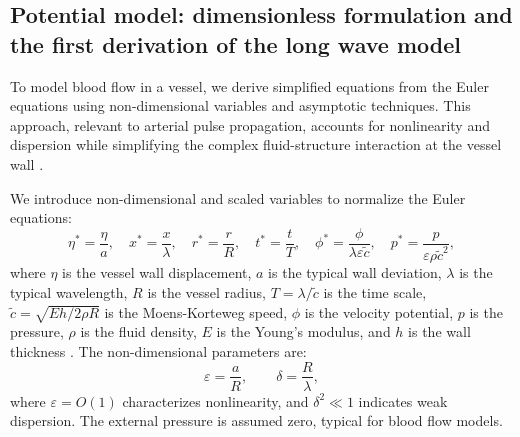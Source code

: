 \documentclass[alpha-refs, 12pt]{wiley-article}
\newcommand{\eps}{\varepsilon}
\begin{document}
\subsection{Potential model: dimensionless formulation and the first derivation of the long wave model}\label{sec:dimless_longwave}

To model blood flow in a vessel, we derive simplified equations from the Euler equations using non-dimensional variables and asymptotic techniques. This approach, relevant to arterial pulse propagation, accounts for nonlinearity and dispersion while simplifying the complex fluid-structure interaction at the vessel wall \cite{Fung1993}.

We introduce non-dimensional and scaled variables to normalize the Euler equations:
\begin{equation}\label{eq:ndv}
  \eta^* = \frac{\eta}{a}, \quad x^* = \frac{x}{\lambda}, \quad r^* = \frac{r}{R}, \quad t^* = \frac{t}{T}, \quad \phi^* = \frac{\phi}{\lambda \eps \tilde{c}}, \quad p^* = \frac{p}{\eps \rho \tilde{c}^2},
\end{equation}
where $\eta$ is the vessel wall displacement, $a$ is the typical wall deviation, $\lambda$ is the typical wavelength, $R$ is the vessel radius, $T = \lambda / \tilde{c}$ is the time scale, $\tilde{c} = \sqrt{E h / 2 \rho R}$ is the Moens-Korteweg speed, $\phi$ is the velocity potential, $p$ is the pressure, $\rho$ is the fluid density, $E$ is the Young's modulus, and $h$ is the wall thickness \cite{Fung1993}. The non-dimensional parameters are:
\begin{equation}\label{eq:parameters}
  \eps = \frac{a}{R}, \qquad \delta = \frac{R}{\lambda},
\end{equation}
where $\eps = O(1)$ characterizes nonlinearity, and $\delta^2 \ll 1$ indicates weak dispersion. The external pressure is assumed zero, typical for blood flow models.
\end{document}
